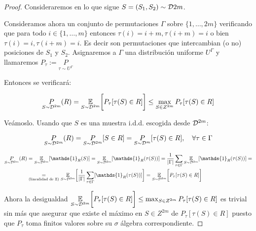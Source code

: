 \begin{proof}
 Consideraremos en lo que sigue $S = (S_1, S_2) \sim \mathcal{D}{2m}$.
 
 Consideramos ahora un conjunto de permutaciones $\Gamma$ sobre $\{1, \ldots, 2m\}$ verificando que para todo $i\in \{1,\ldots, m\}$
 entonces $\tau(i) = i+m, \tau(i+m) = i$ o bien $\tau(i) = i, \tau(i+m) = i$. Es decir son permutaciones que intercambian
 (o no) posiciones de $S_1$ y $S_2$. Asignaremos a $\Gamma$ una distribución uniforme $U^{\Gamma}$ y llamaremos 
 $P_{\tau} := \underset{\tau \sim U^{\Gamma}}{P}$
 
 Entonces se verificará:
 
 \begin{equation}
  \underset{S\sim \mathcal{D}^{2m}}{P}(R) = \underset{S\sim \mathcal{D}^{2m}}{\mathbb{E}} \bigg[P_{\tau} [\tau(S) \in R] \bigg] \le \max_{S\in Z^{2m}} P_{\tau}[\tau(S) \in R]  
  \label{eqn:Rbound}
 \end{equation}

 Veámoslo. Usando que $S$ es una muestra i.d.d. escogida desde $\mathcal{D}^{2m}$:
 
 \[\underset{S\sim \mathcal{D}^{2m}}{P}(R) = \underset{S\sim \mathcal{D}^{2m}}{P}[S \in R] = \underset{S\sim \mathcal{D}^m}{P}[\tau(S) \in R], \quad \forall \tau \in \Gamma\]
 
 \begin{align*}
 \dosmprob(R) &= \dosmexpect [\mathds{1}_R(S)] = \dosmexpect [\mathds{1}_R(\tau(S))]
   = \frac{1}{|\Gamma|} \sum_{\tau \in \Gamma} \dosmexpect [\mathds{1}_R(\tau(S))] = \\
   &\underset{\textrm{(linealidad de $\expect$)}}{=} \dosmexpect \bigg[ \frac{1}{|\Gamma|} 
   \sum_{\tau \in \Gamma} [\mathds{1}_R(\tau(S))]\bigg] = \dosmexpect \bigg[P_{\tau} [\tau(S) \in R] \bigg]
 \end{align*}

 Ahora la desigualdad $\underset{S\sim \mathcal{D}^{2m}}{\mathbb{E}} \bigg[P_{\tau} [\tau(S) \in R] \bigg] \le \max_{S\in Z^{2m}} P_{\tau}[\tau(S) \in R]$
 es trivial sin más que asegurar que existe el máximo en $S\in Z^{2m}$ de $P_{\tau}[\tau(S) \in R]$ puesto que $P_{\tau}$
 toma finitos valores sobre su $\sigma$ álgebra correspondiente.
  
 
 
 
\end{proof}


